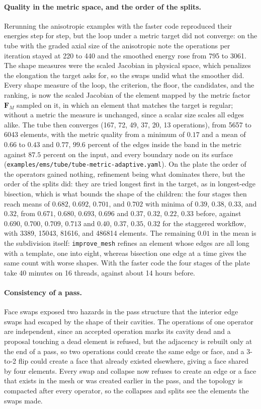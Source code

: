 \documentclass[11pt]{article}
\newcommand{\code}[1]{\texttt{#1}}
\newcommand{\bs}[1]{\boldsymbol{#1}}
\begin{document}
\paragraph{Quality in the metric space, and the order of the splits.}
Rerunning the anisotropic examples with the faster code reproduced their
energies step for step, but the loop under a metric target did not
converge: on the tube with the graded axial size of the anisotropic note
the operations per iteration stayed at 220 to 440 and the smoothed
energy rose from 795 to 3061. The shape measures were the scaled Jacobian
in physical space, which penalizes the elongation the target asks for, so
the swaps undid what the smoother did. Every shape measure of the loop,
the criterion, the floor, the candidates, and the ranking, is now the
scaled Jacobian of the element mapped by the metric factor $\bs F_M$
sampled on it, in which an element that matches the target is regular;
without a metric the measure is unchanged, since a scalar size scales all
edges alike. The tube then converges (167, 72, 49, 37, 20, 13 operations),
from 5657 to 6043 elements, with the metric quality from a minimum of
$0.17$ and a mean of $0.66$ to $0.43$ and $0.77$, $99.6$ percent of the
edges inside the band in the metric against $87.5$ percent on the input,
and every boundary node on its surface
(\code{examples/ems/tube/tube-metric-adaptive.yaml}). On the plate the
order of the operators gained nothing, refinement being what dominates
there, but the order of the splits did: they are tried longest first in
the target, as in longest-edge bisection, which is what bounds the shape
of the children: the four stages then reach means of $0.682$, $0.692$,
$0.701$, and $0.702$ with minima of $0.39$, $0.38$, $0.33$, and $0.32$,
from $0.671$, $0.680$, $0.693$, $0.696$ and $0.37$, $0.32$, $0.22$,
$0.33$ before, against $0.690$, $0.700$, $0.709$, $0.713$ and $0.40$,
$0.37$, $0.35$, $0.32$ for the staggered workflow, with 3389, 15043,
81616, and 486814 elements. The remaining $0.01$ in the mean is the
subdivision itself: \code{improve\_mesh} refines an element whose edges
are all long with a template, one into eight, whereas bisection one edge
at a time gives the same count with worse shapes. With the faster code
the four stages of the plate take 40 minutes on 16 threads, against about
14 hours before.

\paragraph{Consistency of a pass.} Face swaps exposed two hazards in the
pass structure that the interior edge swaps had escaped by the shape of
their cavities. The operations of one operator are independent, since an
accepted operation marks its cavity dead and a proposal touching a dead
element is refused, but the adjacency is rebuilt only at the end of a
pass, so two operations could create the same edge or face, and a
3-to-2 flip could create a face that already existed elsewhere, giving a
face shared by four elements. Every swap and collapse now refuses to
create an edge or a face that exists in the mesh or was created earlier
in the pass, and the topology is compacted after every operator, so the
collapses and splits see the elements the swaps made.
\end{document}

